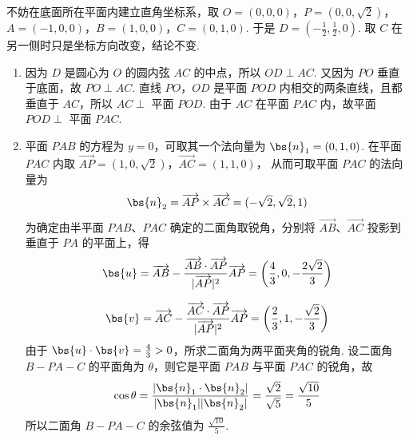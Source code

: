 \begin{solution}
不妨在底面所在平面内建立直角坐标系，取
\(O=(0,0,0)\)，\(P=(0,0,\sqrt{2})\)，\(A=(-1,0,0)\)，\(B=(1,0,0)\)，\(C=(0,1,0)\).
于是 \(D=\left(-\frac{1}{2},\frac{1}{2},0\right)\). 取 \(C\) 在另一侧时只是坐标方向改变，结论不变.

\begin{enumerate}
\item 因为 \(D\) 是圆心为 \(O\) 的圆内弦 \(AC\) 的中点，所以 \(OD\perp AC\). 又因为 \(PO\) 垂直于底面，故 \(PO\perp AC\). 直线 \(PO\)，\(OD\) 是平面 \(POD\) 内相交的两条直线，且都垂直于 \(AC\)，所以 \(AC\perp\) 平面 \(POD\). 由于 \(AC\) 在平面 \(PAC\) 内，故平面 \(POD\perp\) 平面 \(PAC\).

\item 平面 \(PAB\) 的方程为 \(y=0\)，可取其一个法向量为 \(\bs{n}_1=(0,1,0)\). 在平面 \(PAC\) 内取
\(\overrightarrow{AP}=(1,0,\sqrt{2})\)，\(\overrightarrow{AC}=(1,1,0)\)，
从而可取平面 \(PAC\) 的法向量为
\[
\bs{n}_2=\overrightarrow{AP}\times\overrightarrow{AC}=(-\sqrt{2},\sqrt{2},1)
\]
为确定由半平面 \(PAB\)、\(PAC\) 确定的二面角取锐角，分别将 \(\overrightarrow{AB}\)、\(\overrightarrow{AC}\) 投影到垂直于 \(PA\) 的平面上，得
\[
\bs{u}=\overrightarrow{AB}-\frac{\overrightarrow{AB}\cdot\overrightarrow{AP}}{|\overrightarrow{AP}|^2}\overrightarrow{AP}=\left(\frac43,0,-\frac{2\sqrt2}{3}\right)
\]

\[
\bs{v}=\overrightarrow{AC}-\frac{\overrightarrow{AC}\cdot\overrightarrow{AP}}{|\overrightarrow{AP}|^2}\overrightarrow{AP}=\left(\frac23,1,-\frac{\sqrt2}{3}\right)
\]
由于 \(\bs{u}\cdot\bs{v}=\frac43>0\)，所求二面角为两平面夹角的锐角.
设二面角 \(B-PA-C\) 的平面角为 \(\theta\)，则它是平面 \(PAB\) 与平面 \(PAC\) 的锐角，故
\[
\cos\theta=\frac{|\bs{n}_1\cdot\bs{n}_2|}{|\bs{n}_1||\bs{n}_2|}=\frac{\sqrt{2}}{\sqrt{5}}=\frac{\sqrt{10}}{5}
\]
所以二面角 \(B-PA-C\) 的余弦值为 \(\frac{\sqrt{10}}{5}\).
\end{enumerate}
\end{solution}

